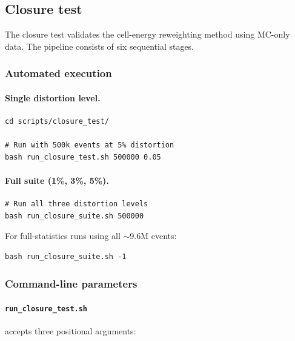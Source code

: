 \documentclass[12pt,a4paper]{article}
\begin{document}
\subsection{Closure test}
\label{sec:running:closure}

The closure test validates the cell-energy reweighting method using
MC-only data. The pipeline consists of six sequential stages.

\subsubsection{Automated execution}

\paragraph{Single distortion level.}

\begin{lstlisting}
cd scripts/closure_test/

# Run with 500k events at 5% distortion
bash run_closure_test.sh 500000 0.05
\end{lstlisting}

\paragraph{Full suite (1\%, 3\%, 5\%).}

\begin{lstlisting}
# Run all three distortion levels
bash run_closure_suite.sh 500000
\end{lstlisting}

For full-statistics runs using all $\sim$9.6M events:

\begin{lstlisting}
bash run_closure_suite.sh -1
\end{lstlisting}

\subsubsection{Command-line parameters}

\paragraph{\texttt{run\_closure\_test.sh}} accepts three positional
arguments:
\end{document}

